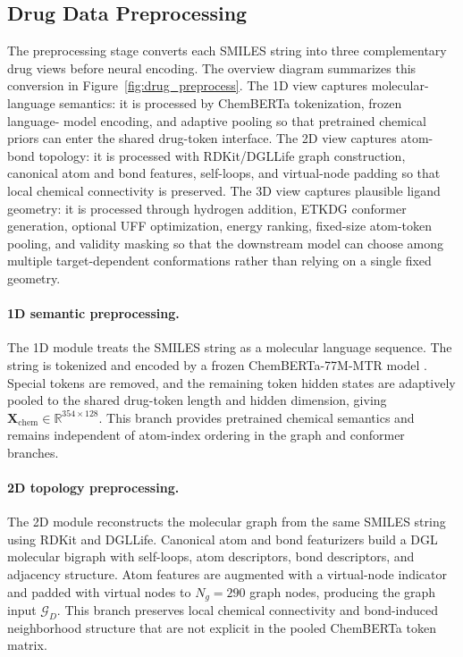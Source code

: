 \subsection{Drug Data Preprocessing}
\label{sec:drug_data_preprocessing}

The preprocessing stage converts each SMILES string into three complementary drug views before neural
encoding. The overview diagram summarizes this conversion in Figure~\ref{fig:drug_preprocess}. The 1D
view captures molecular-language semantics: it is processed by ChemBERTa tokenization, frozen language-
model encoding, and adaptive pooling so that pretrained chemical priors can enter the shared drug-token
interface. The 2D view captures atom-bond topology: it is processed with RDKit/DGLLife graph construction,
canonical atom and bond features, self-loops, and virtual-node padding so that local chemical connectivity is
preserved. The 3D view captures plausible ligand geometry: it is processed through hydrogen addition, ETKDG
conformer generation, optional UFF optimization, energy ranking, fixed-size atom-token pooling, and validity
masking so that the downstream model can choose among multiple target-dependent conformations rather than
relying on a single fixed geometry.

\paragraph{1D semantic preprocessing.}
The 1D module treats the SMILES string as a molecular language sequence. The string is tokenized and encoded
by a frozen ChemBERTa-77M-MTR model \citep{chithrananda2020chemberta}. Special tokens are removed, and the
remaining token hidden states are adaptively pooled to the shared drug-token length and hidden dimension,
giving $\mathbf{X}_{\mathrm{chem}}\in\mathbb{R}^{354\times128}$. This branch provides pretrained chemical
semantics and remains independent of atom-index ordering in the graph and conformer branches.

\paragraph{2D topology preprocessing.}
The 2D module reconstructs the molecular graph from the same SMILES string using RDKit and DGLLife. Canonical
atom and bond featurizers build a DGL molecular bigraph with self-loops, atom descriptors, bond descriptors,
and adjacency structure. Atom features are augmented with a virtual-node indicator and padded with virtual
nodes to $N_g=290$ graph nodes, producing the graph input $\mathcal{G}_D$. This branch preserves local
chemical connectivity and bond-induced neighborhood structure that are not explicit in the pooled ChemBERTa
token matrix.

